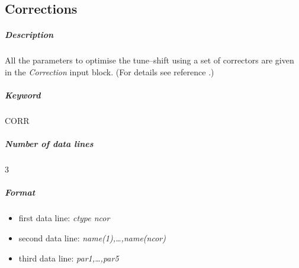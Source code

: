\documentclass[a4paper,11pt]{report}
\begin{document}
\subsection{Corrections} \label{Corrections}

\subparagraph{Description} All the parameters to optimise the
tune--shift using a set of correctors are given in the {\em Correction
  } \/input block. (For details see reference \cite{Massimo}.)

\subparagraph{Keyword} CORR \subparagraph{Number of data lines} 3

\subparagraph{Format}
\begin{itemize}
\item first data line: {\em ctype ncor}
\item second data line: {\em name(1),\ldots,name(ncor)}
\item third data line: {\em par1,\ldots,par5}
\end{itemize}
\end{document}
